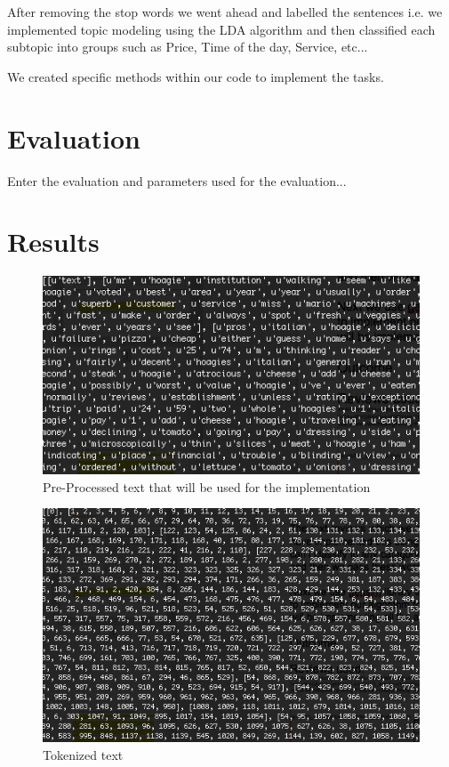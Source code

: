 \documentclass{article}
\begin{document}
	After removing the stop words we went ahead and labelled the sentences i.e. we implemented topic modeling using the 	LDA algorithm and then classified each subtopic into groups such as Price, Time of the day, Service, etc...
	  
	 We created specific methods within our code to implement the tasks. 
	
\section{Evaluation} 
	\label{eval} 

	Enter the evaluation and parameters used for the evaluation...

\section{Results} 
	\label{result} 

\begin{figure}[ht]
	\centerline{\includegraphics[width=\columnwidth]{preproctext}}
	\caption{Pre-Processed text that will be used for the implementation}
	\label{preproctext}
	\vskip 0.15in
\end{figure} 

\begin{figure}[ht]
	\centerline{\includegraphics[width=\columnwidth]{tokenized}}
	\caption{Tokenized text}
	\label{tokenized}
	\vskip 0.15in
\end{figure} 
\end{document}
